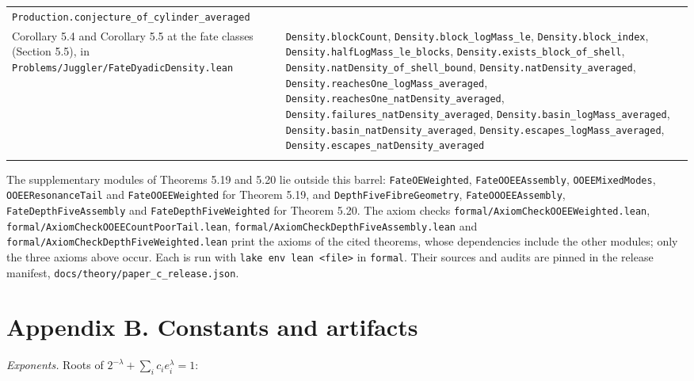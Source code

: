 \documentclass[11pt,a4paper]{article}
\begin{document}
\begin{longtable}[]{@{}
  >{\raggedright\arraybackslash}p{}
  >{\raggedright\arraybackslash}p{}@{}}
\texttt{\nolinkurl{Production.conjecture_of_cylinder_averaged}} \\
Corollary 5.4 and Corollary 5.5 at the fate classes (Section 5.5), in
\texttt{\nolinkurl{Problems/Juggler/FateDyadicDensity.lean}} &
\texttt{\nolinkurl{Density.blockCount}},
\texttt{\nolinkurl{Density.block_logMass_le}},
\texttt{\nolinkurl{Density.block_index}},
\texttt{\nolinkurl{Density.halfLogMass_le_blocks}},
\texttt{\nolinkurl{Density.exists_block_of_shell}},
\texttt{\nolinkurl{Density.natDensity_of_shell_bound}},
\texttt{\nolinkurl{Density.natDensity_averaged}},
\texttt{\nolinkurl{Density.reachesOne_logMass_averaged}},
\texttt{\nolinkurl{Density.reachesOne_natDensity_averaged}},
\texttt{\nolinkurl{Density.failures_natDensity_averaged}},
\texttt{\nolinkurl{Density.basin_logMass_averaged}},
\texttt{\nolinkurl{Density.basin_natDensity_averaged}},
\texttt{\nolinkurl{Density.escapes_logMass_averaged}},
\texttt{\nolinkurl{Density.escapes_natDensity_averaged}} \\*
\end{longtable}

\endgroup

The supplementary modules of Theorems 5.19 and 5.20 lie outside this
barrel: \texttt{\nolinkurl{FateOEWeighted}},
\texttt{\nolinkurl{FateOOEEAssembly}},
\texttt{\nolinkurl{OOEEMixedModes}},
\texttt{\nolinkurl{OOEEResonanceTail}} and
\texttt{\nolinkurl{FateOOEEWeighted}} for Theorem 5.19, and
\texttt{\nolinkurl{DepthFiveFibreGeometry}},
\texttt{\nolinkurl{FateOOOEEAssembly}},
\texttt{\nolinkurl{FateDepthFiveAssembly}} and
\texttt{\nolinkurl{FateDepthFiveWeighted}} for Theorem 5.20. The axiom
checks \texttt{\nolinkurl{formal/AxiomCheckOOEEWeighted.lean}},
\texttt{\nolinkurl{formal/AxiomCheckOOEECountPoorTail.lean}},
\texttt{\nolinkurl{formal/AxiomCheckDepthFiveAssembly.lean}} and
\texttt{\nolinkurl{formal/AxiomCheckDepthFiveWeighted.lean}} print the
axioms of the cited theorems, whose dependencies include the other
modules; only the three axioms above occur. Each is run with
\texttt{lake\ env\ lean\ \textless{}file\textgreater{}} in
\texttt{\nolinkurl{formal}}. Their sources and audits are pinned in the
release manifest, \texttt{\nolinkurl{docs/theory/paper_c_release.json}}.

\section{Appendix B. Constants and
artifacts}\label{appendix-b.-constants-and-artifacts}

\emph{Exponents.} Roots of \(2^{-\lambda}+\sum_ic_ie_i^{\lambda}=1\):
\end{document}
